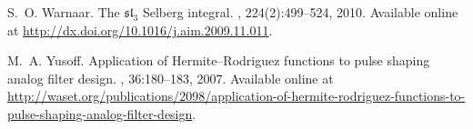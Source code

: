 \begin{thebibliography}{CMS94}
S.~O. Warnaar.
\newblock The {${\mathfrak{sl}}_3$} {S}elberg integral.
, 224(2):499--524, 2010.
\newblock Available online at
  \url{http://dx.doi.org/10.1016/j.aim.2009.11.011}.

M.~A. Yusoff.
\newblock Application of {H}ermite--{R}odriguez functions to pulse shaping
  analog filter design.
, 36:180--183, 2007.
\newblock Available online at
  \url{http://waset.org/publications/2098/application-of-hermite-rodriguez-functions-to-pulse-shaping-analog-filter-design}.

\end{thebibliography}
